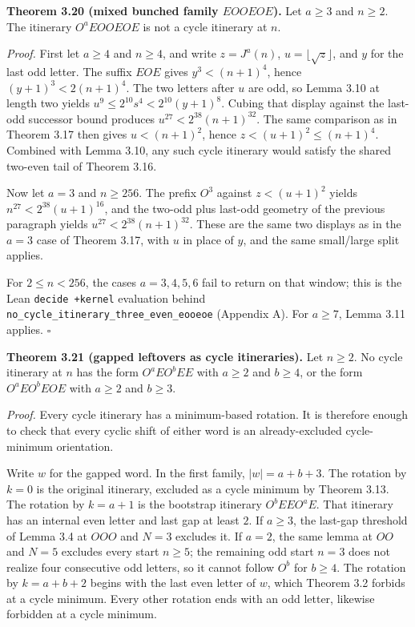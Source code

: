 \documentclass[12pt]{article}
\begin{document}
\textbf{Theorem 3.20 (mixed bunched family \(EOOEOE\)).} Let \(a\ge 3\)
and \(n\ge 2\). The itinerary \(O^aEOOEOE\) is not a cycle itinerary at
\(n\).

\emph{Proof.} First let \(a\ge 4\) and \(n\ge 4\), and write
\(z=J^a(n)\), \(u=\lfloor\sqrt z\rfloor\), and \(y\) for the last odd
letter. The suffix \(EOE\) gives \(y^3<(n+1)^4\), hence
\((y+1)^3<2(n+1)^4\). The two letters after \(u\) are odd, so Lemma 3.10
at length two yields \(u^9\le 2^{10}s^4<2^{10}(y+1)^8\). Cubing that
display against the last-odd successor bound produces
\(u^{27}<2^{38}(n+1)^{32}\). The same comparison as in Theorem 3.17 then
gives \(u<(n+1)^2\), hence \(z<(u+1)^2\le(n+1)^4\). Combined with Lemma
3.10, any such cycle itinerary would satisfy the shared two-even tail of
Theorem 3.16.

Now let \(a=3\) and \(n\ge 256\). The prefix \(O^3\) against
\(z<(u+1)^2\) yields \(n^{27}<2^{38}(u+1)^{16}\), and the two-odd plus
last-odd geometry of the previous paragraph yields
\(u^{27}<2^{38}(n+1)^{32}\). These are the same two displays as in the
\(a=3\) case of Theorem 3.17, with \(u\) in place of \(y\), and the same
small/large split applies.

For \(2\le n<256\), the cases \(a=3,4,5,6\) fail to return on that
window; this is the Lean \texttt{decide\ +kernel} evaluation behind
\texttt{\nolinkurl{no_cycle_itinerary_three_even_eooeoe}} (Appendix A).
For \(a\ge 7\), Lemma 3.11 applies. \(\square\)

\textbf{Theorem 3.21 (gapped leftovers as cycle itineraries).} Let
\(n\ge 2\). No cycle itinerary at \(n\) has the form \(O^aEO^bEE\) with
\(a\ge 2\) and \(b\ge 4\), or the form \(O^aEO^bEOE\) with \(a\ge 2\)
and \(b\ge 3\).

\emph{Proof.} Every cycle itinerary has a minimum-based rotation. It is
therefore enough to check that every cyclic shift of either word is an
already-excluded cycle-minimum orientation.

Write \(w\) for the gapped word. In the first family,
\(\lvert w\rvert=a+b+3\). The rotation by \(k=0\) is the original
itinerary, excluded as a cycle minimum by Theorem 3.13. The rotation by
\(k=a+1\) is the bootstrap itinerary \(O^bEEO^aE\). That itinerary has
an internal even letter and last gap at least \(2\). If \(a\ge 3\), the
last-gap threshold of Lemma 3.4 at \(OOO\) and \(N=3\) excludes it. If
\(a=2\), the same lemma at \(OO\) and \(N=5\) excludes every start
\(n\ge 5\); the remaining odd start \(n=3\) does not realize four
consecutive odd letters, so it cannot follow \(O^b\) for \(b\ge 4\). The
rotation by \(k=a+b+2\) begins with the last even letter of \(w\), which
Theorem 3.2 forbids at a cycle minimum. Every other rotation ends with
an odd letter, likewise forbidden at a cycle minimum.
\end{document}
